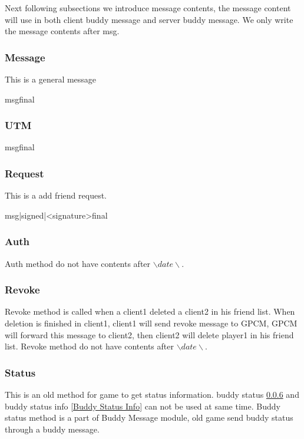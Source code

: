 \documentclass[oneside,titlepage,a4paper]{Definition/retrospy} %
\begin{document}
Next following subsections we introduce message contents,  the message content will use in both client buddy message and server buddy message. We only write the message contents after \tbs msg\tbs.
\subsubsection{Message}
This is a general message

\begin{mybox}
	\tbs msg\tbs<message content>\tbs final\tbs
\end{mybox}


\subsubsection{UTM}

\begin{mybox}
	\tbs msg\tbs<UTM message>\tbs final\tbs
\end{mybox}


\subsubsection{Request}
This is a add friend request.
\ServerResponse

\begin{mybox}
	\tbs msg\tbs|signed|<signature>\tbs final\tbs
\end{mybox}

\subsubsection{Auth}
Auth method do not have contents after $ \backslash date \backslash $.
\subsubsection{Revoke}
Revoke method is called when a client1 deleted a client2 in his friend list. When deletion is finished in client1, client1 will send revoke message to GPCM, GPCM will forward this message to client2, then client2 will delete player1 in his friend list.
Revoke method do not have contents after $ \backslash date \backslash $.
\subsubsection{Status}\label{Buddy Status}
This is an old method for game to get status information. buddy status \ref{Buddy Status} and buddy status info \ref{Buddy Status Info} can not be used at same time. Buddy status method is a part of Buddy Message module, old game send buddy status through a buddy message.
\ServerResponse
\end{document}
